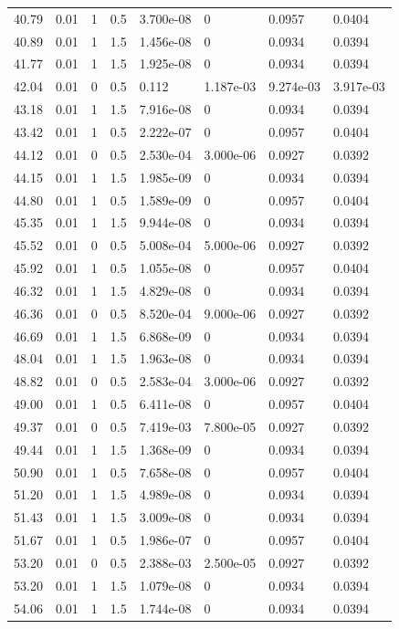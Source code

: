 \documentclass[preview]{standalone}
\begin{document}
{{{\begin{tabular}{L{1.2cm}C{1.2cm} C{0.3cm}C{0.5cm} C{1.4cm}C{1.4cm} C{1.4cm}C{1.4cm}}
  40.79  &  0.01  & 1     & 0.5 &  3.700e-08  & 0  & 0.0957 &  0.0404   \\ 
  40.89  &  0.01  & 1     & 1.5 &  1.456e-08  & 0  & 0.0934 &  0.0394   \\ 
  41.77  &  0.01  & 1     & 1.5 &  1.925e-08  & 0  & 0.0934 &  0.0394   \\ 
  42.04  &  0.01  & 0     & 0.5 &  0.112  & 1.187e-03  & 9.274e-03 &  3.917e-03   \\ 
  43.18  &  0.01  & 1     & 1.5 &  7.916e-08  & 0  & 0.0934 &  0.0394   \\ 
  43.42  &  0.01  & 1     & 0.5 &  2.222e-07  & 0  & 0.0957 &  0.0404   \\ 
  44.12  &  0.01  & 0     & 0.5 &  2.530e-04  & 3.000e-06  & 0.0927 &  0.0392   \\ 
  44.15  &  0.01  & 1     & 1.5 &  1.985e-09  & 0  & 0.0934 &  0.0394   \\ 
  44.80  &  0.01  & 1     & 0.5 &  1.589e-09  & 0  & 0.0957 &  0.0404   \\ 
  45.35  &  0.01  & 1     & 1.5 &  9.944e-08  & 0  & 0.0934 &  0.0394   \\ 
  45.52  &  0.01  & 0     & 0.5 &  5.008e-04  & 5.000e-06  & 0.0927 &  0.0392   \\ 
  45.92  &  0.01  & 1     & 0.5 &  1.055e-08  & 0  & 0.0957 &  0.0404   \\ 
  46.32  &  0.01  & 1     & 1.5 &  4.829e-08  & 0  & 0.0934 &  0.0394   \\ 
  46.36  &  0.01  & 0     & 0.5 &  8.520e-04  & 9.000e-06  & 0.0927 &  0.0392   \\ 
  46.69  &  0.01  & 1     & 1.5 &  6.868e-09  & 0  & 0.0934 &  0.0394   \\ 
  48.04  &  0.01  & 1     & 1.5 &  1.963e-08  & 0  & 0.0934 &  0.0394   \\ 
  48.82  &  0.01  & 0     & 0.5 &  2.583e-04  & 3.000e-06  & 0.0927 &  0.0392   \\ 
  49.00  &  0.01  & 1     & 0.5 &  6.411e-08  & 0  & 0.0957 &  0.0404   \\ 
  49.37  &  0.01  & 0     & 0.5 &  7.419e-03  & 7.800e-05  & 0.0927 &  0.0392   \\ 
  49.44  &  0.01  & 1     & 1.5 &  1.368e-09  & 0  & 0.0934 &  0.0394   \\ 
  50.90  &  0.01  & 1     & 0.5 &  7.658e-08  & 0  & 0.0957 &  0.0404   \\ 
  51.20  &  0.01  & 1     & 1.5 &  4.989e-08  & 0  & 0.0934 &  0.0394   \\ 
  51.43  &  0.01  & 1     & 1.5 &  3.009e-08  & 0  & 0.0934 &  0.0394   \\ 
  51.67  &  0.01  & 1     & 0.5 &  1.986e-07  & 0  & 0.0957 &  0.0404   \\ 
  53.20  &  0.01  & 0     & 0.5 &  2.388e-03  & 2.500e-05  & 0.0927 &  0.0392   \\ 
  53.20  &  0.01  & 1     & 1.5 &  1.079e-08  & 0  & 0.0934 &  0.0394   \\ 
  54.06  &  0.01  & 1     & 1.5 &  1.744e-08  & 0  & 0.0934 &  0.0394   \\ 
\hline 
\end{tabular} 

}}}
\end{document}
